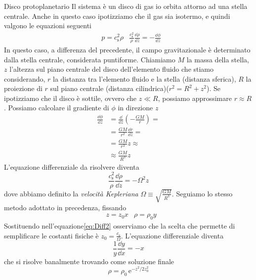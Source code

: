 \begin{Example}{Disco protoplanetario}
Il sistema è un disco di gas io orbita attorno ad una stella centrale. Anche in questo caso ipotizziamo che il gas sia isotermo, e quindi valgono le equazioni seguenti
\begin{align*}
& p=c_\mathrm{s}^2 \rho
& \frac{c_\mathrm{s}^2}{\rho} \frac{\dd \rho}{\dd z} = -\frac{\dd \phi}{\dd z}
\end{align*}
In questo caso, a differenza del precedente, il campo gravitazionale è determinato dalla stella centrale, considerata puntiforme. Chiamiamo $M$ la massa della stella, $z$ l'altezza sul piano centrale del disco dell'elemento fluido che stiamo considerando, $r$ la distanza tra l'elemento fluido e la stella (distanza sferica), $R$ la proiezione di $r$ sul piano centrale (distanza cilindrica)($r^2 = R^2+z^2$). Se ipotizziamo che il disco è sottile, ovvero che $z \ll R$, possiamo approssimare $r\approx R$. Possiamo calcolare il gradiente di $\phi$ in direzione $z$
\begin{align*}
\frac{\dd \phi}{\dd z} &= \frac{\dd}{\dd z} \left( -\frac{GM}{r} \right) = \\
&= \frac{GM}{r^2} \frac{\dd r}{\dd z} = \\
&= \frac{GM}{r^3}z \approx \\
& \approx \frac{GM}{R^3}z
\end{align*}
L'equazione differenziale da risolvere diventa
\begin{equation}
\frac{c_\mathrm{s}^2}{\rho} \frac{\dd \rho}{\dd z} = -\Omega^2 z \label{eq:Diff2}
\end{equation}
dove abbiamo definito la \textit{velocità Kepleriana} $\Omega\equiv \sqrt{\frac{GM}{R^3}}$. Seguiamo lo stesso metodo adottato in precedenza, fissando 
\begin{align*}
&z=z_0 x
& \rho = \rho_0 y
\end{align*}
Sostituendo nell'equazione\ref{eq:Diff2} osserviamo che la scelta che permette di semplificare le costanti fisiche è $z_0=\frac{c_\mathrm{s}}{\Omega}$. L'equazione differenziale diventa
\begin{equation}
\frac{1}{y} \frac{\dd y}{\dd x} = -x
\end{equation}
che si risolve banalmente trovando come soluzione finale
\begin{equation}
\rho = \rho_0 \, \mathrm{e} ^{-z^2/2z_0^2}
\end{equation}
\end{Example}



